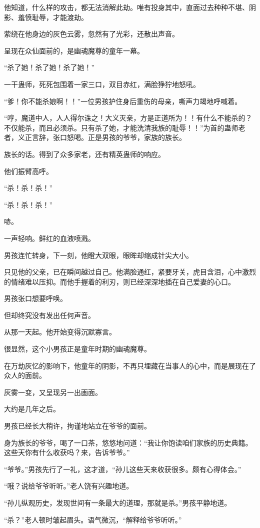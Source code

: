 \begin{this_body}
他知道，什么样的攻击，都无法消解此劫。唯有投身其中，直面过去种种不堪、阴影、羞愤耻辱，才能渡劫。

萦绕在他身边的灰色云雾，忽然有了光彩，还散出声音。

呈现在众仙面前的，是幽魂魔尊的童年一幕。

“杀了她！杀了她！杀了她！”

一干蛊师，死死包围着一家三口，双目赤红，满脸狰狞地怒吼。

“爹！你不能杀娘啊！！”一位男孩护住身后重伤的母亲，嘶声力竭地呼喊着。

“哼，魔道中人，人人得尔诛之！大义灭亲，方是正道所为！！有什么不能杀的？不仅能杀，而且必须杀。只有杀了她，才能洗清我族的耻辱！！”为首的蛊师老者，义正言辞，张口怒喝。正是男孩的爷爷，家族的族长。

族长的话。得到了众多家老，还有精英蛊师的响应。

他们振臂高呼。

“杀！杀！杀！”

“杀！杀！杀！”

哧。

一声轻响。鲜红的血液喷溅。

男孩连忙转身，下一刻，他瞪大双眼，眼眸却缩成针尖大小。

只见他的父亲，已在瞬间越过自己。他满脸通红，紧要牙关，虎目含泪，心中激烈的情绪难以压抑。而他手握着的利刃，则已经深深地插在自己爱妻的心口。

男孩张口想要呼唤。

但却终究没有发出任何声音。

从那一天起。他开始变得沉默寡言。

很显然，这个小男孩正是童年时期的幽魂魔尊。

在万劫灰忆的影响下，他童年的阴影，不再只埋藏在当事人的心中，而是展现在了众人的面前。

灰雾一变，又呈现另一出画面。

大约是几年之后。

男孩已经长大稍许，拘谨地站立在爷爷的面前。

身为族长的爷爷，喝了一口茶，悠悠地问道：“我让你饱读咱们家族的历史典籍。这些天你有什么收获吗？来，告诉爷爷。”

“爷爷。”男孩先行了一礼，这才道，“孙儿这些天来收获很多。颇有心得体会。”

“哦？说给爷爷听听。”老人饶有兴趣地道。

“孙儿纵观历史，发现世间有一条最大的道理，那就是杀。”男孩平静地道。

“杀？”老人顿时皱起眉头。语气微沉，“解释给爷爷听听。”


\end{this_body}
